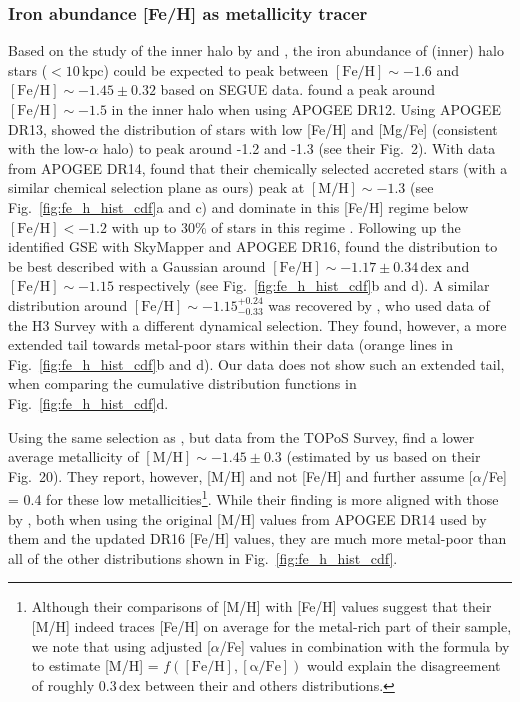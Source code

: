 \documentclass[fleqn,usenatbib]{mnras}
\newcommand{\dex}{\,\mathrm{dex}}	%
\newcommand{\kpc}{\,\mathrm{kpc}}	%
\begin{document}
\subsubsection{Iron abundance [Fe/H] as metallicity tracer} \label{sec:gse_stellar_chemistry_fe_h}

Based on the study of the inner halo by \citet{Carollo2007} and \citet{Ivezic2008}, the iron abundance of (inner) halo stars ($<10\kpc$) could be expected to peak between $\mathrm{[Fe/H]} \sim -1.6$ and $\mathrm{[Fe/H]} \sim -1.45\pm0.32$ based on SEGUE data. \citet{FernandezAlvar2017} found a peak around $\mathrm{[Fe/H]} \sim -1.5$ in the inner halo when using APOGEE DR12. Using APOGEE DR13, \citet{Hayes2018} showed the distribution of stars with low [Fe/H] and [Mg/Fe] (consistent with the low-$\alpha$ halo) to peak around -1.2 and -1.3 (see their Fig.~2). With data from APOGEE DR14, \citet{Das2020} found that their chemically selected accreted stars (with a similar chemical selection plane as ours) peak at $\mathrm{[M/H]} \sim -1.3$ (see Fig.~\ref{fig:fe_h_hist_cdf}a and c) and dominate in this [Fe/H] regime below $\mathrm{[Fe/H]} < -1.2$ with up to 30\% of stars in this regime \citep[see also][]{Mackereth2019}. Following up the identified GSE with SkyMapper and APOGEE DR16, \citet{Feuillet2020, Feuillet2021} found the distribution to be best described with a Gaussian around $\mathrm{[Fe/H]} \sim -1.17 \pm 0.34\dex$ and $\mathrm{[Fe/H]} \sim -1.15$ respectively (see Fig.~\ref{fig:fe_h_hist_cdf}b and d). A similar distribution around $\mathrm{[Fe/H]} \sim -1.15_{-0.33}^{+0.24}$ was recovered by \citet{Naidu2020}, who used data of the H3 Survey with a different dynamical selection. They found, however, a more extended tail towards metal-poor stars within their data (orange lines in Fig.~\ref{fig:fe_h_hist_cdf}b and d). Our data does not show such an extended tail, when comparing the cumulative distribution functions in Fig.~\ref{fig:fe_h_hist_cdf}d.

Using the same selection as \citet{Feuillet2020}, but data from the TOPoS Survey, \citet{Bonifacio2021} find a lower average metallicity of $\mathrm{[M/H]} \sim -1.45 \pm 0.3$ (estimated by us based on their Fig.~20). They report, however, [M/H] and not [Fe/H] and further assume [$\alpha$/Fe] = 0.4 for these low metallicities\footnote{Although their comparisons of [M/H] with [Fe/H] values suggest that their [M/H] indeed traces [Fe/H] on average for the metal-rich part of their sample, we note that using adjusted [$\alpha$/Fe] values in combination with the formula by \citet{Salaris2006} to estimate [M/H] = $f(\mathrm{[Fe/H]}, \mathrm{[\alpha/Fe]})$ would explain the disagreement of roughly $0.3 \dex$ between their and others distributions.}. While their finding is more aligned with those by \citet{Das2020}, both when using the original [M/H] values from APOGEE DR14 used by them and the updated DR16 [Fe/H] values, they are much more metal-poor than all of the other distributions shown in Fig.~\ref{fig:fe_h_hist_cdf}.
\end{document}
